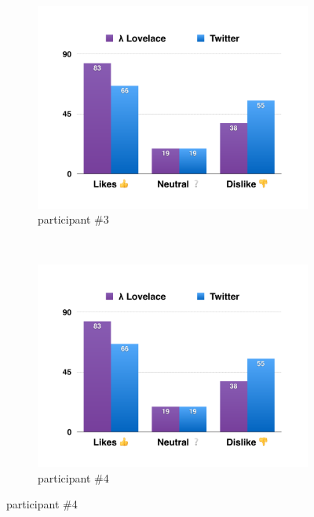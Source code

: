 \documentclass{article}
\begin{document}
\begin{figure}
    \begin{subfigure}[b]{0.48\textwidth}
        \includegraphics[page=3,width=\textwidth]{evaluation_charts}
        \caption{participant \#3}
        \label{fig:participant3}
    \end{subfigure}
    ~
    \begin{subfigure}[b]{0.48\textwidth}
        \includegraphics[page=4,width=\textwidth]{evaluation_charts}
        \caption{participant \#4}
        \label{fig:participant4}
    \end{subfigure}
    
    \vspace{2em}
    

\end{figure}
\end{document}
